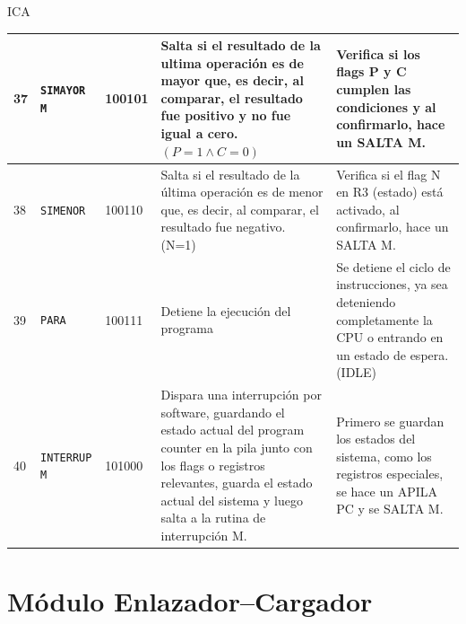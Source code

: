 ICA\documentclass{article}
\begin{document}
\begin{longtable}{|p{}|p{}|p{}|p{}|p{}|}
  \hline
  37                 & \texttt{SIMAYOR M}                               & 100101                          & Salta si el resultado de la ultima operación es de mayor que, es decir, al comparar, el resultado fue positivo y no fue igual a cero. $(P = 1 \land C = 0)$                                                                   & Verifica si los flags P y C cumplen las condiciones y al confirmarlo, hace un SALTA M.                                 \\
  \hline
  38                 & \texttt{SIMENOR}                                 & 100110                          & Salta si el resultado de la última operación es de menor que, es decir, al comparar, el resultado fue negativo.  (N=1)                                                                                                        & Verifica si el flag N en R3 (estado) está activado, al confirmarlo, hace un SALTA M.                                   \\
  \hline
  39                 & \texttt{PARA}                                    & 100111                          & Detiene la ejecución del programa                                                                                                                                                                                             & Se detiene el ciclo de instrucciones, ya sea deteniendo completamente la CPU o entrando en un estado de espera. (IDLE) \\
  \hline
  40                 & \texttt{INTERRUP M}                              & 101000                          & Dispara una interrupción por software, guardando el estado actual del program counter en la pila junto con los flags o registros relevantes, guarda el estado actual del sistema y luego salta a la rutina de interrupción M. & Primero se guardan los estados del sistema, como los registros especiales, se hace un APILA PC y se SALTA M.           \\
  \hline
\end{longtable}




\section{Módulo Enlazador–Cargador}
\end{document}
